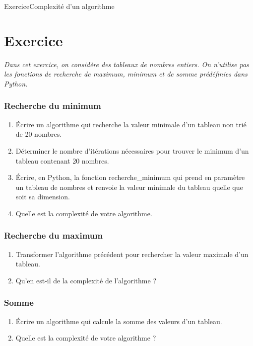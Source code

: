 \documentclass[11pt,a4paper]{article}
\newcounter{numexo}
\begin{document}
\begin{NSI}
{Exercice}{Complexité d'un algorithme}
\end{NSI}




\addtocounter{numexo}{1}
\section*{\Large Exercice \thenumexo}

\textit{Dans cet exercice, on considère des tableaux de nombres entiers. On n'utilise pas les fonctions de recherche de maximum, minimum et de somme prédéfinies dans Python.}

\subsubsection*{Recherche du minimum}

\begin{enumerate}
\item Écrire un algorithme qui recherche la valeur minimale d'un tableau non trié de 20 nombres.
\item Déterminer le nombre d'itérations nécessaires pour trouver le minimum d'un tableau contenant 20 nombres.
\item Écrire, en Python, la fonction \textsf{recherche\_minimum} qui prend en paramètre un tableau de nombres et renvoie la valeur minimale du tableau quelle que soit sa dimension.
\item Quelle est la complexité de votre algorithme.
\end{enumerate}

\subsubsection*{Recherche du maximum}

\begin{enumerate}
\item Transformer l'algorithme précédent pour rechercher la valeur maximale d'un tableau.
\item Qu'en est-il de la complexité de l'algorithme ?
\end{enumerate}


\subsubsection*{Somme}

\begin{enumerate}
\item Écrire un algorithme qui calcule la somme des valeurs d'un tableau.
\item Quelle est la complexité de votre algorithme ?
\end{enumerate}
\end{document}

